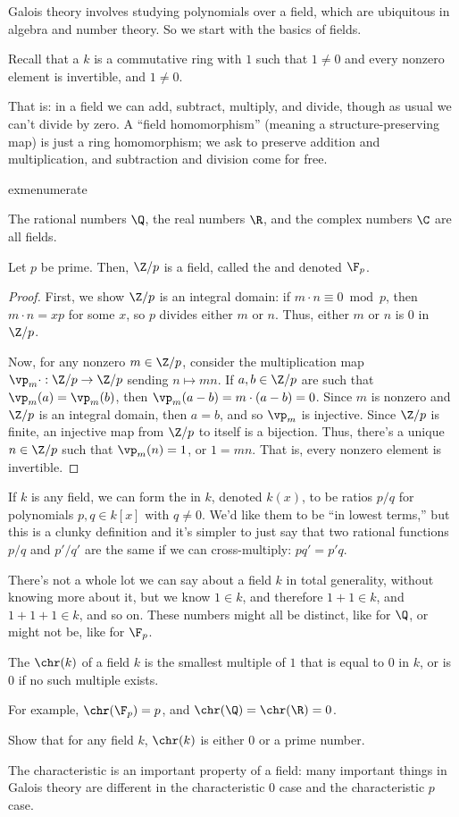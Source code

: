 Galois theory involves studying polynomials over a field, which are ubiquitous in algebra and number theory. So we
start with the basics of fields.
\begin{defn}
Recall that a  $k$ is a commutative ring with $1$ such that $1\ne 0$ and every nonzero element is
invertible, and $1\ne 0$.
\end{defn}
That is: in a field we can add, subtract, multiply, and divide, though as usual we can't divide by zero. A ``field
homomorphism'' (meaning a structure-preserving map) is just a ring homomorphism; we ask to preserve addition and
multiplication, and subtraction and division come for free.
\begin{comp}{exm}{enumerate}
	\item The rational numbers $\Q$, the real numbers $\R$, and the complex numbers $\C$ are all fields.
	\item Let $p$ be prime. Then, $\Z/p$ is a field, called the  and denoted
	$\F_p$.
	\begin{proof}
	First, we show $\Z/p$ is an integral domain: if $m\cdot n\equiv 0\bmod p$, then $m\cdot n = xp$ for some $x$,
	so $p$ divides either $m$ or $n$. Thus, either $m$ or $n$ is $0$ in $\Z/p$.

	Now, for any nonzero $m\in\Z/p$, consider the multiplication map $\vp_m\cdot:\Z/p\to\Z/p$ sending $n\mapsto
	mn$. If $a,b\in\Z/p$ are such that $\vp_m(a) = \vp_m(b)$, then $\vp_m(a-b) = m\cdot(a-b) = 0$. Since $m$ is
	nonzero and $\Z/p$ is an integral domain, then $a = b$, and so $\vp_m$ is injective. Since $\Z/p$ is finite, an
	injective map from $\Z/p$ to itself is a bijection. Thus, there's a unique $n\in\Z/p$ such that $\vp_m(n) = 1$,
	or $1 = mn$. That is, every nonzero element is invertible.
	\end{proof}
	\item If $k$ is any field, we can form the  in $k$, denoted $k(x)$, to be
	ratios $p/q$ for polynomials $p,q\in k[x]$ with $q\ne 0$. We'd like them to be ``in lowest terms,'' but this is
	a clunky definition and it's simpler to just say that two rational functions $p/q$ and $p'/q'$ are the same if
	we can cross-multiply: $pq' = p'q$.
\end{comp}
There's not a whole lot we can say about a field $k$ in total generality, without knowing more about it, but we
know $1\in k$, and therefore $1+1\in k$, and $1+1+1\in k$, and so on. These numbers might all be distinct, like for
$\Q$, or might not be, like for $\F_p$.
\begin{defn}
The  $\chr(k)$ of a field $k$ is the smallest multiple of $1$ that is equal to $0$ in $k$, or
is $0$ if no such multiple exists.
\end{defn}
For example, $\chr(\F_p) = p$, and $\chr(\Q) = \chr(\R) = 0$.
\begin{ex}
Show that for any field $k$, $\chr(k)$ is either $0$ or a prime number.
\end{ex}
The characteristic is an important property of a field: many important things in Galois theory are different in the
characteristic $0$ case and the characteristic $p$ case.

